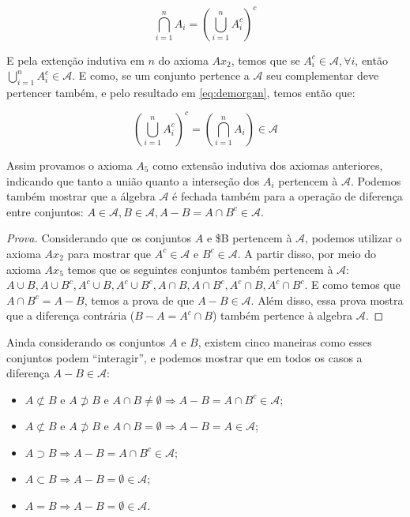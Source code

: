 \documentclass[
]{article}
\providecommand{\tightlist}{%
  \setlength{\itemsep}{0pt}\setlength{\parskip}{0pt}}
\theoremstyle{definition}
\theoremstyle{definition}
\theoremstyle{definition}
\theoremstyle{definition}
\theoremstyle{remark}
\begin{document}
\begin{equation}
\bigcap_{i=1}^{n}A_{i} = \left(\bigcup_{i = 1}^{n}A_{i}^{c}\right)^{c}
\label{eq:demorgan}
\end{equation}

E pela extenção indutiva em \(n\) do axioma \(Ax_{2}\), temos que se \(A_{i}^{c} \in \mathcal{A}, \forall i\), então \(\bigcup_{i = 1}^{n}A_{i}^{c} \in \mathcal{A}\). E como, se um conjunto pertence a \(\mathcal{A}\) seu complementar deve pertencer também, e pelo resultado em \eqref{eq:demorgan}, temos então que:

\begin{equation}
\left(\bigcup_{i = 1}^{n}A_{i}^{c}\right)^{c} = \left(\bigcap_{i = 1}^{n}A_{i}\right) \in \mathcal{A}
\label{eq:axioma5}
\end{equation}

Assim provamos o axioma \(A_{5}\) como extensão indutiva dos axiomas anteriores, indicando que tanto a união quanto a interseção dos \(A_{i}\) pertencem à \(\mathcal{A}\). Podemos também mostrar que a álgebra \(\mathcal{A}\) é fechada também para a operação de diferença entre conjuntos: \(A \in \mathcal{A}, B \in \mathcal{A}, A-B = A \cap B^{c} \in \mathcal{A}\).

\begin{proof}[Prova]
Considerando que os conjuntos \(A\) e \$B pertencem à \(\mathcal{A}\), podemos utilizar o axioma \(Ax_{2}\) para mostrar que \(A^{c} \in \mathcal{A}\) e \(B^{c} \in \mathcal{A}\). A partir disso, por meio do axioma \(Ax_{5}\) temos que os seguintes conjuntos também pertencem à \(\mathcal{A}\): \(A \cup B, A \cup B^{c}, A^{c} \cup B, A^{c} \cup B^{c}, A \cap B, A \cap B^{c}, A^{c} \cap B, A^{c} \cap B^{c}\). E como temos que \(A \cap B^{c} = A-B\), temos a prova de que \(A-B \in \mathcal{A}\). Além disso, essa prova mostra que a diferença contrária (\(B - A = A^{c} \cap B\)) também pertence à algebra \(\mathcal{A}\).
\end{proof}

Ainda considerando os conjuntos \(A\) e \(B\), existem cinco maneiras como esses conjuntos podem ``interagir'', e podemos mostrar que em todos os casos a diferença \(A-B \in \mathcal{A}\):

\begin{itemize}
\tightlist
\item
  \(A \not\subset B\) e \(A \not\supset B\) e \(A \cap B \neq \emptyset \Rightarrow A-B = A \cap B^{c} \in \mathcal{A}\);
\item
  \(A \not\subset B\) e \(A \not\supset B\) e \(A \cap B = \emptyset \Rightarrow A-B = A \in \mathcal{A}\);
\item
  \(A \supset B \Rightarrow A-B = A \cap B^{c} \in \mathcal{A}\);
\item
  \(A \subset B \Rightarrow A-B = \emptyset \in \mathcal{A}\);
\item
  \(A = B \Rightarrow A-B = \emptyset \in \mathcal{A}\).
\end{itemize}
\end{document}
